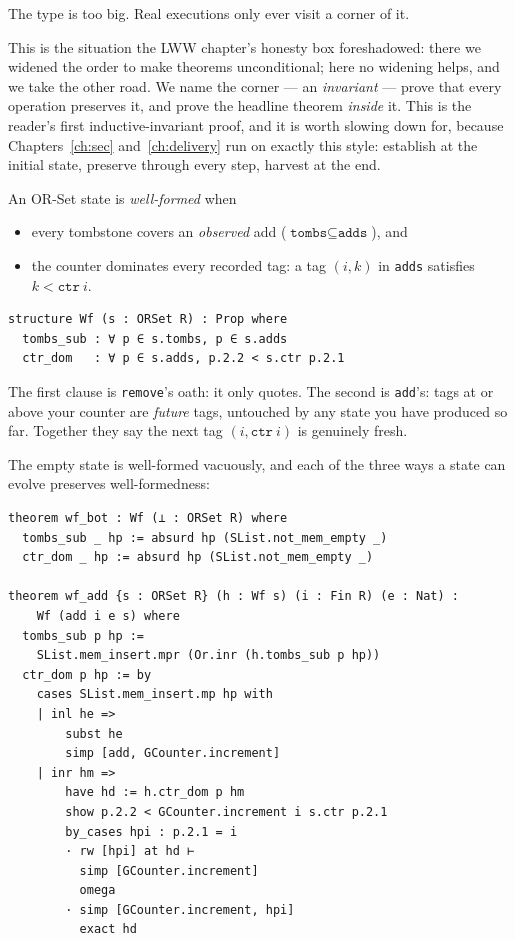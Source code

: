 \documentclass[12pt, a4paper, openright]{book}
\theoremstyle{thmstyle}
\theoremstyle{defstyle}
\newcommand{\lc}[1]{\texttt{#1}}
\newenvironment{defbox}[1][]{%
  \begin{tcolorbox}[defbox, title={Definition\ifx\\#1\\\else\ --- #1\fi}]%
}{\end{tcolorbox}}
\newcommand{\lean}[1]{\texttt{#1}}
\begin{document}
The type is too big. Real executions only ever visit a corner of it.

This is the situation the LWW chapter's honesty box foreshadowed: there
we widened the order to make theorems unconditional; here no widening
helps, and we take the other road. We name the corner --- an
\emph{invariant} --- prove that every operation preserves it, and prove
the headline theorem \emph{inside} it. This is the reader's first
inductive-invariant proof, and it is worth slowing down for, because
Chapters~\ref{ch:sec} and~\ref{ch:delivery} run on exactly this style:
establish at the initial state, preserve through every step, harvest at
the end.

\begin{defbox}[well-formed OR-Set]
  An OR-Set state is \emph{well-formed} when
  \begin{itemize}[nosep]
    \item every tombstone covers an \emph{observed} add
          ($\lean{tombs} \subseteq \lean{adds}$), and
    \item the counter dominates every recorded tag: a tag $(i,k)$ in
          \lc{adds} satisfies $k < \lean{ctr}\ i$.
  \end{itemize}
\end{defbox}

\begin{verbatim}
structure Wf (s : ORSet R) : Prop where
  tombs_sub : ∀ p ∈ s.tombs, p ∈ s.adds
  ctr_dom   : ∀ p ∈ s.adds, p.2.2 < s.ctr p.2.1
\end{verbatim}

The first clause is \lc{remove}'s oath: it only quotes. The second is
\lc{add}'s: tags at or above your counter are \emph{future} tags,
untouched by any state you have produced so far. Together they say the
next tag $(i, \lean{ctr}\ i)$ is genuinely fresh.

The empty state is well-formed vacuously, and each of the three ways a
state can evolve preserves well-formedness:

\begin{verbatim}
theorem wf_bot : Wf (⊥ : ORSet R) where
  tombs_sub _ hp := absurd hp (SList.not_mem_empty _)
  ctr_dom _ hp := absurd hp (SList.not_mem_empty _)

theorem wf_add {s : ORSet R} (h : Wf s) (i : Fin R) (e : Nat) :
    Wf (add i e s) where
  tombs_sub p hp :=
    SList.mem_insert.mpr (Or.inr (h.tombs_sub p hp))
  ctr_dom p hp := by
    cases SList.mem_insert.mp hp with
    | inl he =>
        subst he
        simp [add, GCounter.increment]
    | inr hm =>
        have hd := h.ctr_dom p hm
        show p.2.2 < GCounter.increment i s.ctr p.2.1
        by_cases hpi : p.2.1 = i
        · rw [hpi] at hd ⊢
          simp [GCounter.increment]
          omega
        · simp [GCounter.increment, hpi]
          exact hd
\end{verbatim}
\end{document}
